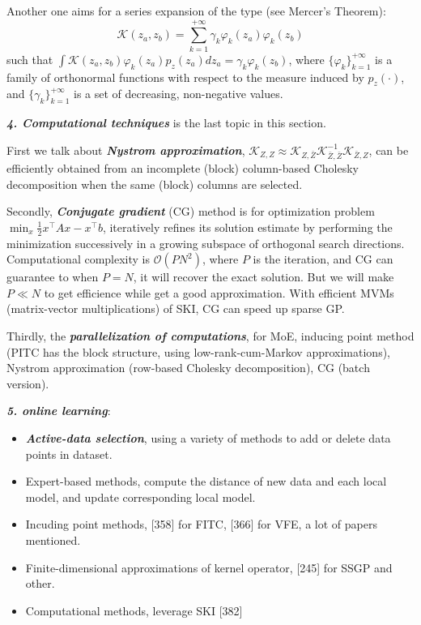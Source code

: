 \documentclass[10pt]{elegantbook}
\newcommand{\mydefination}[1]{\textbf{\textit{\textcolor{structurecolor}{#1}}}}
\begin{document}
Another one aims for a series expansion of the type (see Mercer's Theorem):
\[
\mathscr{K}(z_{a},z_{b}) = \sum_{k=1}^{+\infty}\gamma_{k}\varphi_{k}(z_{a})\varphi_{k}(z_{b})
\]
such that $\int \mathscr{K}(z_{a},z_{b})\varphi_{k}(z_{a})p_{z}(z_{a})d z_{a}=\gamma_{k}\varphi_{k}(z_{b})$, where 
$\{ \varphi_k \}_{k=1}^{+\infty}$ is a family of orthonormal functions with respect to the measure induced by $p_z(\cdot)$,
and $\{ \gamma_k \}_{k=1}^{+\infty}$ is a set of decreasing, non-negative values.

\mydefination{4. Computational techniques} is the last topic in this section. 

First we talk about \mydefination{Nystrom approximation}, $\mathscr{K}_{Z, Z} \approx \mathscr{K}_{Z, 
\bar Z}\mathscr{K}_{\bar Z, \bar Z}^{-1}\mathscr{K}_{\bar Z, Z}$, can be efficiently obtained from an incomplete (block)
column-based Cholesky decomposition when the same (block) columns are selected.

Secondly, \mydefination{Conjugate gradient} (CG) method is for optimization problem $\min_x \frac{1}{2} x^{\top} A x -x^{\top}b$,
iteratively refines its solution estimate by performing the minimization successively in a growing subspace of orthogonal 
search directions. Computational complexity is $\mathcal O(PN^2)$, where $P$ is the iteration, and CG can guarantee to when 
$P = N$, it will recover the exact solution. But we will make $P \ll N$ to get efficience while get a good approximation.
With efficient MVMs (matrix-vector multiplications) of SKI, CG can speed up sparse GP.

Thirdly, the \mydefination{parallelization of computations}, for MoE, inducing point method (PITC has the block structure, using low-rank-cum-Markov
approximations), Nystrom approximation (row-based Cholesky decomposition), CG (batch version).

\mydefination{5. online learning}:
\begin{itemize}
    \item \mydefination{Active-data selection}, using a variety of methods to add or delete data points in dataset.
    \item Expert-based methods, compute the distance of new data and each local model, and update corresponding local model.
    \item Incuding point methods, [358] for FITC, [366] for VFE, a lot of papers mentioned.
    \item Finite-dimensional approximations of kernel operator,  [245] for SSGP and other.
    \item Computational methods, leverage SKI [382]
\end{itemize}
\end{document}
